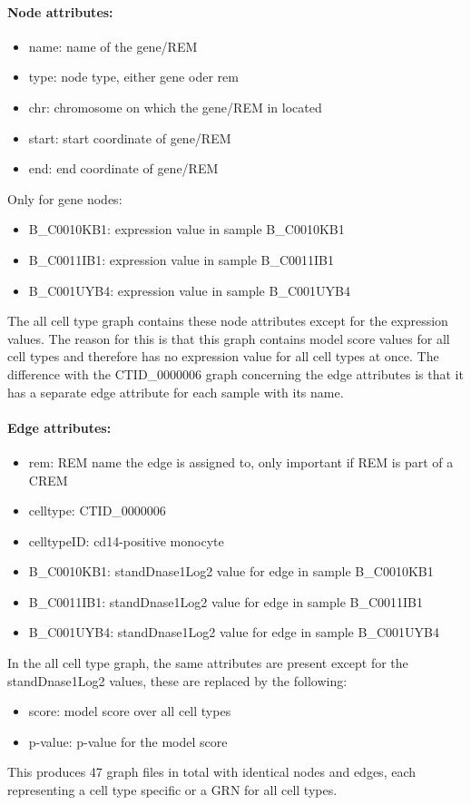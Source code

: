 \documentclass[pdftex,12pt,a4paper]{report}
\begin{document}
\paragraph{Node attributes:} 
\begin{itemize}
\item name: name of the gene/REM
\item type: node type, either gene oder rem
\item chr: chromosome on which the gene/REM in located
\item start: start coordinate of gene/REM
\item end: end coordinate of gene/REM
\end{itemize}
Only for gene nodes:
\begin{itemize}
\item B\_C0010KB1: expression value in sample B\_C0010KB1
\item B\_C0011IB1: expression value in sample B\_C0011IB1
\item B\_C001UYB4: expression value in sample B\_C001UYB4
\end{itemize}
The all cell type graph contains these node attributes except for the expression values. The reason for this is that this graph contains model score values for all cell types and therefore has no expression value for all cell types at once. 
The difference with the CTID\_0000006 graph concerning the edge attributes is that it has a separate edge attribute for each sample with its name. 
\paragraph{Edge attributes:} 
\begin{itemize}
\item rem: REM name the edge is assigned to, only important if REM is part of a CREM
\item celltype: CTID\_0000006
\item celltypeID: cd14-positive monocyte
\item B\_C0010KB1: standDnase1Log2 value for edge in sample B\_C0010KB1
\item B\_C0011IB1: standDnase1Log2 value for edge in sample B\_C0011IB1
\item B\_C001UYB4: standDnase1Log2 value for edge in sample B\_C001UYB4
\end{itemize}
In the all cell type graph, the same attributes are present except for the standDnase1Log2 values, these are replaced by the following:
\begin{itemize}
\item score: model score over all cell types
\item p-value: p-value for the model score
\end{itemize}
This produces 47 graph files in total with identical nodes and edges, each representing a cell type specific or a GRN for all cell types.
\end{document}
